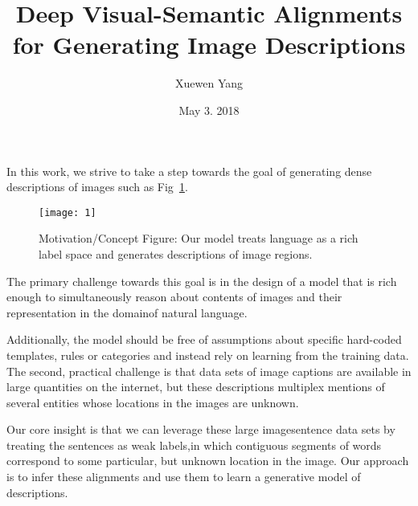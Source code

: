 \documentclass{article}
\author{Xuewen Yang}
\date{May 3. 2018}
\title{Deep Visual-Semantic Alignments for Generating Image Descriptions}
\begin{document}
\maketitle
In this work, we strive to take a step towards the goal of generating dense descriptions of images such as Fig~\ref{fig:lable}.

\begin{figure}[htbp]
\small
\centering
\texttt{[image: 1]}
\caption{Motivation/Concept Figure: Our model treats language as a rich label space and generates descriptions of image regions.}
\label{fig:lable}
\end{figure}

The primary challenge towards this goal is in the design of a model that is rich enough to simultaneously reason about contents of images and their representation in the domainof natural language.

Additionally, the model should be free of assumptions about specific hard-coded templates, rules or categories and instead rely on learning from the training data. The second, practical challenge is that data sets of image captions are available in large quantities on the internet\cite{higham2014bibtex}, but these descriptions multiplex mentions of several entities whose locations in the images are unknown.

Our core insight is that we can leverage these large imagesentence data sets by treating the sentences as weak labels,in which contiguous segments of words correspond to some particular, but unknown location in the image. Our approach is to infer these alignments and use them to learn a generative model of descriptions.

\end{document}
